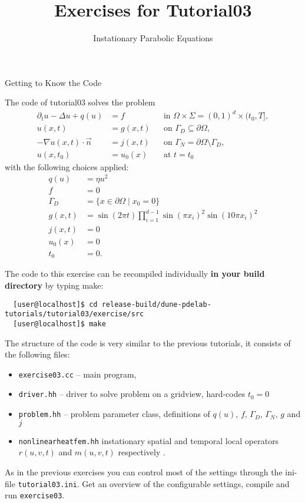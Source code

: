 \documentclass[12pt,a4paper]{article}
\title{\textbf{Exercises for Tutorial03}}
\subtitle{Instationary Parabolic Equations}
\begin{document}
\exerciseheader

\begin{Exercise}{Getting to Know the Code}

  \lstset{language=bash}

  The code of tutorial03 solves the problem
  \begin{align}
    \partial_t u-\Delta u+q(u) &= f && \text{in }\Omega\times\Sigma =
    (0,1)^d \times (t_0, T], \\
    u(x,t) & =g(x,t) && \text{on }\Gamma_D\subseteq\partial\Omega, \\
    -\nabla u(x,t) \cdot \vec{n} &= j(x,t) &&
    \text{on }\Gamma_N=\partial\Omega\setminus\Gamma_D, \\
    u(x,t_0)&=u_0(x) && \text{at } t=t_0
  \end{align}
  with the following choices applied:
  \begin{align}
    \label{ch1:first}
    q(u) &= \eta u^2 \\
    f &= 0 \\
    \Gamma_D &= \{x \in\partial\Omega \mid x_0 = 0 \} \\
    g(x,t) &= \sin(2\pi t) \prod_{i=1}^{d-1} \sin(\pi x_i)^2
    \sin(10\pi x_i)^2\\
    j(x,t) &= 0 \\
    u_0(x) &= 0 \\
    \label{ch1:last}
    t_0&=0 .
  \end{align}

  The code to this exercise can be recompiled individually \textbf{in
    your build directory} by typing make:
  \begin{lstlisting}
  [user@localhost]$ cd release-build/dune-pdelab-tutorials/tutorial03/exercise/src
  [user@localhost]$ make
  \end{lstlisting}

  The structure of the code is very similar to the previous tutorials,
  it consists of the following files:
  \begin{itemize}
  \item \lstinline!exercise03.cc! -- main program,
  \item \lstinline!driver.hh! -- driver to solve problem on a gridview,
    hard-codes $t_0=0$
  \item \lstinline!problem.hh! -- problem parameter class, definitions
    of $q(u)$, $f$, $\Gamma_D$, $\Gamma_N$, $g$ and $j$
  \item \lstinline!nonlinearheatfem.hh! instationary spatial and
    temporal local operators $r(u,v,t)$ and $m(u,v,t)$ respectively .
  \end{itemize}
  As in the previous exercises you can control most of the settings
  through the ini-file \lstinline!tutorial03.ini!. Get an overview of
  the configurable settings, compile and run \lstinline!exercise03!.


\end{Exercise}
\end{document}
